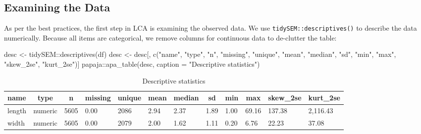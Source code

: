 \documentclass[
  man,floatsintext]{apa6}
\newenvironment{Shaded}{\begin{snugshade}}{\end{snugshade}}
\newcommand{\AttributeTok}[1]{\textcolor[rgb]{0.77,0.63,0.00}{#1}}
\newcommand{\FunctionTok}[1]{\textcolor[rgb]{0.00,0.00,0.00}{#1}}
\newcommand{\NormalTok}[1]{#1}
\newcommand{\OtherTok}[1]{\textcolor[rgb]{0.56,0.35,0.01}{#1}}
\newcommand{\SpecialCharTok}[1]{\textcolor[rgb]{0.00,0.00,0.00}{#1}}
\newcommand{\StringTok}[1]{\textcolor[rgb]{0.31,0.60,0.02}{#1}}
\begin{document}
\hypertarget{examining-the-data}{%
\subsection{Examining the Data}\label{examining-the-data}}

As per the best practices,
the first step in LCA is examining the observed data.
We use \texttt{tidySEM::descriptives()} to describe the data numerically.
Because all items are categorical,
we remove columns for continuous data to de-clutter the table:

\begin{Shaded}
\begin{Highlighting}[]
\NormalTok{desc }\OtherTok{\textless{}{-}}\NormalTok{ tidySEM}\SpecialCharTok{::}\FunctionTok{descriptives}\NormalTok{(df)}
\NormalTok{desc }\OtherTok{\textless{}{-}}\NormalTok{ desc[, }\FunctionTok{c}\NormalTok{(}\StringTok{"name"}\NormalTok{, }\StringTok{"type"}\NormalTok{, }\StringTok{"n"}\NormalTok{, }\StringTok{"missing"}\NormalTok{, }\StringTok{"unique"}\NormalTok{, }\StringTok{"mean"}\NormalTok{,}
    \StringTok{"median"}\NormalTok{, }\StringTok{"sd"}\NormalTok{, }\StringTok{"min"}\NormalTok{, }\StringTok{"max"}\NormalTok{, }\StringTok{"skew\_2se"}\NormalTok{, }\StringTok{"kurt\_2se"}\NormalTok{)]}
\NormalTok{papaja}\SpecialCharTok{::}\FunctionTok{apa\_table}\NormalTok{(desc, }\AttributeTok{caption =} \StringTok{"Descriptive statistics"}\NormalTok{)}
\end{Highlighting}
\end{Shaded}

\begin{table}[tbp]

\begin{center}
\begin{threeparttable}

\caption{\label{tab:tabdesc}Descriptive statistics}

\begin{tabular}{llllllllllll}
\toprule
name & \multicolumn{1}{c}{type} & \multicolumn{1}{c}{n} & \multicolumn{1}{c}{missing} & \multicolumn{1}{c}{unique} & \multicolumn{1}{c}{mean} & \multicolumn{1}{c}{median} & \multicolumn{1}{c}{sd} & \multicolumn{1}{c}{min} & \multicolumn{1}{c}{max} & \multicolumn{1}{c}{skew\_2se} & \multicolumn{1}{c}{kurt\_2se}\\
\midrule
length & numeric & 5605 & 0.00 & 2086 & 2.94 & 2.37 & 1.89 & 1.00 & 69.16 & 137.38 & 2,116.43\\
width & numeric & 5605 & 0.00 & 2079 & 2.00 & 1.62 & 1.11 & 0.20 & 6.76 & 22.23 & 37.08\\
\bottomrule
\end{tabular}

\end{threeparttable}
\end{center}

\end{table}
\end{document}
